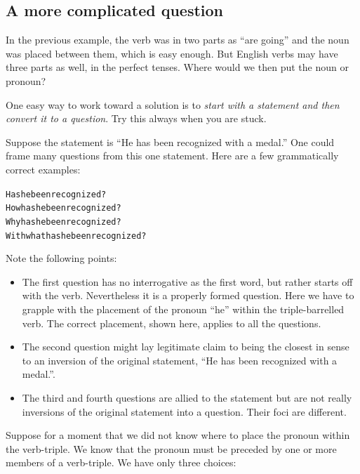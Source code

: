 \documentclass[
  a4paper,
]{article}
\newcommand\pronoun[1]{\textcolor{pronoun}{#1}}
\newcommand\action[1]{\textcolor{action}{#1}}
\begin{document}
\hypertarget{a-more-complicated-question}{%
\subsection{A more complicated
question}\label{a-more-complicated-question}}

In the previous example, the verb was in two parts as ``are going'' and
the noun was placed between them, which is easy enough. But English
verbs may have three parts as well, in the perfect tenses. Where would
we then put the noun or pronoun?

One easy way to work toward a solution is to \emph{start with a
statement and then convert it to a question}. Try this always when you
are stuck.

Suppose the statement is ``He has been recognized with a medal.'' One
could frame many questions from this one statement. Here are a few
grammatically correct examples:

\begin{tcolorbox}
\begin{alltt}
\color{normal}
\action{Has} \pronoun{he} \action{been recognized}?
How \action{has} \pronoun{he} \action{been recognized}?
Why \action{has} \pronoun{he} \action{been recognized}?
With what \action{has} \pronoun{he} \action{been recognized}?
\end{alltt}
\end{tcolorbox}

Note the following points:

\begin{itemize}
\item
  The first question has no interrogative as the first word, but rather
  starts off with the verb. Nevertheless it is a properly formed
  question. Here we have to grapple with the placement of the pronoun
  ``he'' within the triple-barrelled verb. The correct placement, shown
  here, applies to all the questions.
\item
  The second question might lay legitimate claim to being the closest in
  sense to an inversion of the original statement, ``He has been
  recognized with a medal.''.
\item
  The third and fourth questions are allied to the statement but are not
  really inversions of the original statement into a question. Their
  foci are different.
\end{itemize}

Suppose for a moment that we did not know where to place the pronoun
within the verb-triple. We know that the pronoun must be preceded by one
or more members of a verb-triple. We have only three choices:
\end{document}
